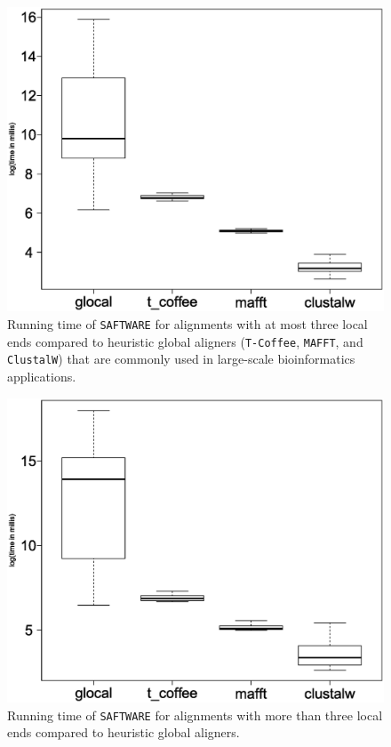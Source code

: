 \documentclass[a4paper,10pt]{article}
\newcommand{\TODO}[1]{\begingroup\color{red}#1\endgroup}
\newcommand{\SAFTWARE}{\TODO{\texttt{SAFTWARE}}}
\begin{document}
\begin{figure}
  \begin{center}
    \includegraphics[width=1\columnwidth]{times_smaller4_boxplot.eps}
  \end{center}
  \caption{Running time of \SAFTWARE{} for alignments with at most three
    local ends compared to heuristic global aligners (\texttt{T-Coffee},
    \texttt{MAFFT}, and \texttt{ClustalW}) that are commonly used in
    large-scale bioinformatics applications.}
 \label{fig:littleLoc}
\end{figure}

\begin{figure}
  \begin{center}
    \includegraphics[width=1\columnwidth]{times_bigger3_boxplot.eps}
  \end{center}
  \caption{Running time of \SAFTWARE{} for alignments with more than three
    local ends compared to heuristic global aligners.}
  \label{fig:manyLoc}
\end{figure}
\end{document}
